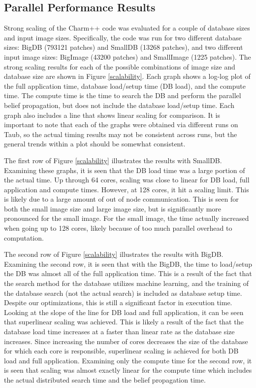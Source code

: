 \documentclass[a4paper]{article}
\begin{document}
\subsection{Parallel Performance Results}
Strong scaling of the Charm++ code was evaluated for a couple of database sizes and input image sizes.  Specifically, the code was run for two different database sizes: BigDB (793121 patches) and SmallDB (13268 patches), and two different input image sizes:  BigImage (43200 patches) and SmallImage (1225 patches).  The strong scaling results for each of the possible combinations of image size and database size are shown in Figure \ref{scalability}.  Each graph shows a log-log plot of the full application time, database load/setup time (DB load), and the compute time.  The compute time is the time to search the DB and perform the parallel belief propagation, but does not include the database load/setup time.  Each graph also includes a line that shows linear scaling for comparison.  It is important to note that each of the graphs were obtained via different runs on Taub, so the actual timing results may not be consistent across runs, but the general trends within a plot should be somewhat consistent.

The first row of Figure \ref{scalability} illustrates the results with SmallDB.  Examining these graphs, it is seen that the DB load time was a large portion of the actual time.  Up through 64 cores, scaling was close to linear for DB load, full application and compute times.  However, at 128 cores, it hit a scaling limit.  This is likely due to a large amount of out of node communication.  This is seen for both the small image size and large image size, but is significantly more pronounced for the small image.  For the small image, the time actually increased when going up to 128 cores, likely because of too much parallel overhead to computation.

The second row of Figure \ref{scalability} illustrates the results with BigDB.  Examining the second row, it is seen that with the BigDB, the time to load/setup the DB was almost all of the full application time. This is a result of the fact that the search method for the database utilizes machine learning, and the training of the database search (not the actual search) is included as database setup time.  Despite our optimizations, this is still a significant factor in execution time.  Looking at the slope of the line for DB load and full application, it can be seen that superlinear scaling was achieved.  This is likely a result of the fact that the database load time increases at a faster than linear rate as the database size increases.  Since increasing the number of cores decreases the size of the database for which each core is responsible, superlinear scaling is achieved for both DB load and full application.  Examining only the compute time for the second row, it is seen that scaling was almost exactly linear for the compute time which includes the actual distributed search time and the belief propagation time.
\end{document}
